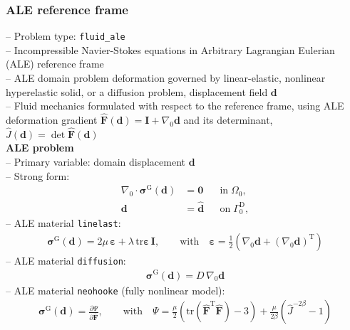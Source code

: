 \documentclass[a4paper,12pt]{report}
\newcommand{\bs}[1]{\boldsymbol{#1}}
\newcommand{\Om}{\mathit{\Omega}}
\newcommand{\Gm}{\mathit{\Gamma}}
\begin{document}
\subsubsection{ALE reference frame}\label{ale-reference-frame}

-- Problem type: \verb.fluid_ale.\\

-- Incompressible Navier-Stokes equations in Arbitrary Lagrangian Eulerian (ALE) reference frame\\

-- ALE domain problem deformation governed by linear-elastic, nonlinear hyperelastic solid, or a diffusion problem, displacement field $\bs{d}$\\

-- Fluid mechanics formulated with respect to the reference frame, using ALE deformation gradient $\widehat{\bs{F}}(\bs{d}) = \bs{I} + \nabla_0\bs{d}$ and its determinant, $\widehat{J}(\bs{d})=\det \widehat{\bs{F}}(\bs{d})$\\

\textbf{ALE problem}\\

-- Primary variable: domain displacement $\bs{d}$\\

-- Strong form:
\begin{equation}
\label{equation-ale-strong-form}
\begin{aligned}
\nabla_{0} \cdot \bs{\sigma}^{\mathrm{G}}(\bs{d}) &= \bs{0} &&\text{in} \; \mathit{\Om}_0, \\
\bs{d} &= \hat{\bs{d}} &&\text{on} \; \mathit{\Gm}_0^{\mathrm{D}},
\end{aligned}
\end{equation}
-- ALE material \verb.linelast.:
\begin{equation}
\begin{aligned}
\bs{\sigma}^{\mathrm{G}}(\bs{d}) = 2\mu \,\bs{\varepsilon} + \lambda \,\mathrm{tr}\bs{\varepsilon}\,\bs{I}, \qquad \text{with}\quad \bs{\varepsilon} = \frac{1}{2}\left(\nabla_0\bs{d} + (\nabla_0\bs{d})^{\mathrm{T}}\right)
\end{aligned}
\end{equation}
-- ALE material \verb.diffusion.:
\begin{equation}
\begin{aligned}
\bs{\sigma}^{\mathrm{G}}(\bs{d}) = D \,\nabla_0\bs{d}
\end{aligned}
\end{equation}
-- ALE material \verb.neohooke. (fully nonlinear model):
\begin{equation}
\begin{aligned}
\bs{\sigma}^{\mathrm{G}}(\bs{d}) = \frac{\partial \mathit{\Psi}}{\partial \widehat{\bs{F}}}, \qquad \text{with}\quad \mathit{\Psi} = \frac{\mu}{2}\left(\mathrm{tr}(\widehat{\bs{F}}^{\mathrm{T}}\widehat{\bs{F}}) - 3\right) + \frac{\mu}{2\beta} \left(\widehat{J}^{-2\beta} - 1\right)
\end{aligned}
\end{equation}
\end{document}
